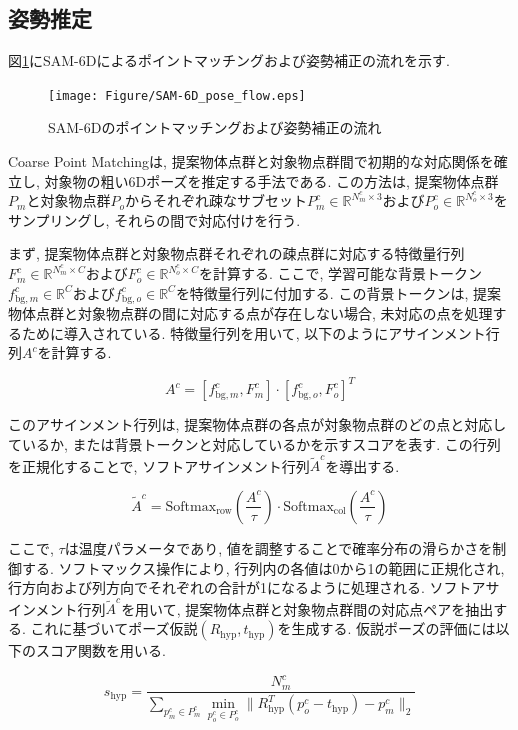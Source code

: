 \subsection{姿勢推定}
図\ref{fig:2-f9}にSAM-6Dによるポイントマッチングおよび姿勢補正の流れを示す. 
\begin{figure}[htbt]
	\centering
	 \texttt{[image: Figure/SAM-6D\_pose\_flow.eps]}
	 \caption{SAM-6Dのポイントマッチングおよび姿勢補正の流れ}
	 \label{fig:2-f9}
\end{figure}

Coarse Point Matchingは, 提案物体点群と対象物点群間で初期的な対応関係を確立し, 対象物の粗い6Dポーズを推定する手法である. 
この方法は, 提案物体点群$P_m$と対象物点群$P_o$からそれぞれ疎なサブセット$P_m^c \in \mathbb{R}^{N_m^c \times 3}$および$P_o^c \in \mathbb{R}^{N_o^c \times 3}$をサンプリングし, それらの間で対応付けを行う. 

まず, 提案物体点群と対象物点群それぞれの疎点群に対応する特徴量行列$F_m^c \in \mathbb{R}^{N_m^c \times C}$および$F_o^c \in \mathbb{R}^{N_o^c \times C}$を計算する. 
ここで, 学習可能な背景トークン$f_{\text{bg}, m}^c \in \mathbb{R}^C$および$f_{\text{bg}, o}^c \in \mathbb{R}^C$を特徴量行列に付加する. 
この背景トークンは, 提案物体点群と対象物点群の間に対応する点が存在しない場合, 未対応の点を処理するために導入されている. 
特徴量行列を用いて, 以下のようにアサインメント行列$A^c$を計算する. 

\[
A^c = [f_{\text{bg}, m}^c, F_m^c] \cdot [f_{\text{bg}, o}^c, F_o^c]^T
\]

このアサインメント行列は, 提案物体点群の各点が対象物点群のどの点と対応しているか, または背景トークンと対応しているかを示すスコアを表す. 
この行列を正規化することで, ソフトアサインメント行列$\tilde{A}^c$を導出する. 

\[
\tilde{A}^c = \text{Softmax}_{\text{row}}\left(\frac{A^c}{\tau}\right) \cdot \text{Softmax}_{\text{col}}\left(\frac{A^c}{\tau}\right)
\]

ここで, $\tau$は温度パラメータであり, 値を調整することで確率分布の滑らかさを制御する. 
ソフトマックス操作により, 行列内の各値は0から1の範囲に正規化され, 行方向および列方向でそれぞれの合計が1になるように処理される. 
ソフトアサインメント行列$\tilde{A}^c$を用いて, 提案物体点群と対象物点群間の対応点ペアを抽出する. 
これに基づいてポーズ仮説$(R_{\text{hyp}}, t_{\text{hyp}})$を生成する. 仮説ポーズの評価には以下のスコア関数を用いる. 

\[
s_{\text{hyp}} = \frac{N_m^c}{\sum_{p_m^c \in P_m^c} \min_{p_o^c \in P_o^c} \| R_{\text{hyp}}^T (p_o^c - t_{\text{hyp}}) - p_m^c \|_2 }
\]


